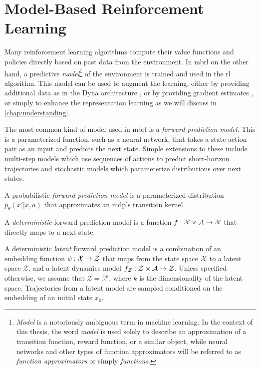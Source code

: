 \section{Model-Based Reinforcement Learning}
\label{sec:model_learning}

Many reinforcement learning algorithms compute their value functions and policies directly based on past data from the environment.
In \ac{mbrl} on the other hand, a predictive \emph{model}\footnote{\emph{Model} is a notoriously ambiguous term in machine learning. In the context of this thesis, the word \emph{model} is used solely to describe an approximation of a transition function, reward function, or a similar object, while neural networks and other types of function approximators will be referred to as \emph{function approximators} or simply \emph{functions}.} of the environment is trained and used in the \ac{rl} algorithm.
This model can be used to augment the learning, either by providing additional data as in the Dyna architecture \parencite{dyna}, or by providing gradient estimates \parencite{hafner2020dream,amos2021model}, or simply to enhance the representation learning as we will discuss in \autoref{chap:understanding}.

The most common kind of model used in \ac{mbrl} is a \emph{forward prediction model}.
This is a parameterized function, such as a neural network, that takes a state-action pair as an input and predicts the next state.
Simple extensions to these include multi-step models which use sequences of actions to predict short-horizon trajectories and stochastic models which parameterize distributions over next states.

\begin{definition}
    A probabilistic \emph{forward prediction model} is a parameterized distribution $\hat{p}_\theta(x'|x,a)$ that approximates an \ac{mdp}'s transition kernel.
    
    A \emph{deterministic} forward prediction model is a function $f: \mathcal{X} \times \mathcal{A} \rightarrow \mathcal{X}$ that directly maps to a next state.

    A deterministic \emph{latent} forward prediction model is a combination of an embedding function $\phi: \mathcal{X} \rightarrow \mathcal{Z}$ that maps from the state space $\mathcal{X}$ to a latent space $\mathcal{Z}$, and a latent dynamics model $f_\mathcal{Z}: \mathcal{Z} \times \mathcal{A} \rightarrow \mathcal{Z}$.
    Unless specified otherwise, we assume that $\mathcal{Z} = \mathbb{R}^k$, where $k$ is the dimensionality of the latent space.
    Trajectories from a latent model are sampled conditioned on the embedding of an initial state $x_0$.
\end{definition}

